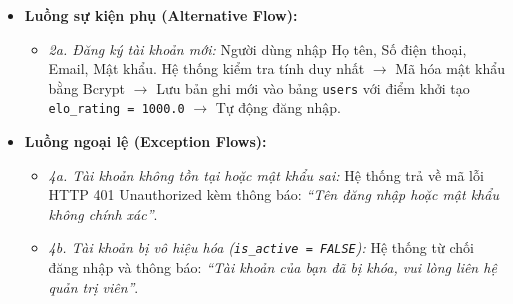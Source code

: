 \begin{itemize}[leftmargin=1.5cm]
\begin{enumerate}
        \item Trả về mã HTTP 200 OK cùng Token; giao diện lưu thông tin và chuyển hướng người dùng.
    \end{enumerate}
    \item \textbf{Luồng sự kiện phụ (Alternative Flow):} 
    \begin{itemize}
        \item \textit{2a. Đăng ký tài khoản mới:} Người dùng nhập Họ tên, Số điện thoại, Email, Mật khẩu. Hệ thống kiểm tra tính duy nhất $\rightarrow$ Mã hóa mật khẩu bằng Bcrypt $\rightarrow$ Lưu bản ghi mới vào bảng \texttt{users} với điểm khởi tạo \texttt{elo\_rating = 1000.0} $\rightarrow$ Tự động đăng nhập.
    \end{itemize}
    \item \textbf{Luồng ngoại lệ (Exception Flows):}
    \begin{itemize}
        \item \textit{4a. Tài khoản không tồn tại hoặc mật khẩu sai:} Hệ thống trả về mã lỗi HTTP 401 Unauthorized kèm thông báo: \textit{``Tên đăng nhập hoặc mật khẩu không chính xác''}.
        \item \textit{4b. Tài khoản bị vô hiệu hóa (\texttt{is\_active = FALSE}):} Hệ thống từ chối đăng nhập và thông báo: \textit{``Tài khoản của bạn đã bị khóa, vui lòng liên hệ quản trị viên''}.
    \end{itemize}
\end{itemize}

